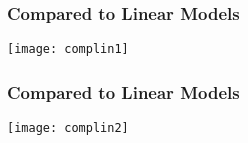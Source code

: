 %
%




\begin{frame}[fragile]\frametitle{Compared to Linear Models}
\begin{center}
\texttt{[image: complin1]}
\end{center}

\end{frame}

\begin{frame}[fragile]\frametitle{Compared to Linear Models}
\begin{center}
\texttt{[image: complin2]}
\end{center}

\end{frame}



